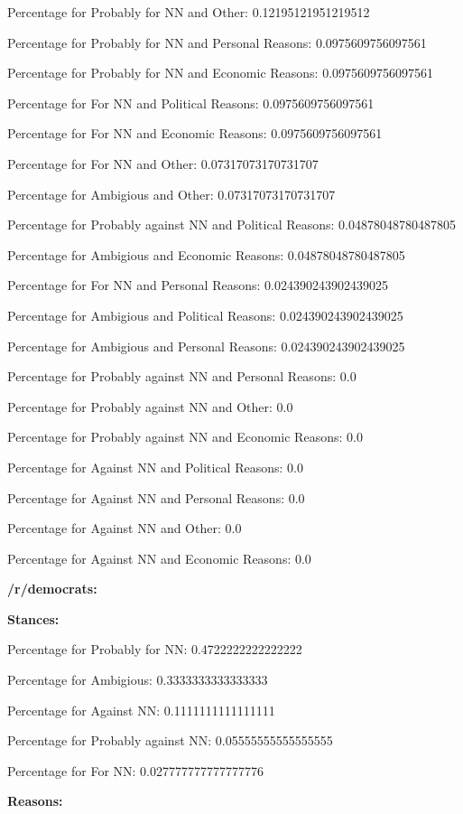 \documentclass[11pt]{article}
\begin{document}
	Percentage for Probably for NN and Other: 0.12195121951219512
	
	Percentage for Probably for NN and Personal Reasons: 0.0975609756097561
	
	Percentage for Probably for NN and Economic Reasons: 0.0975609756097561
	
	Percentage for For NN and Political Reasons: 0.0975609756097561
	
	Percentage for For NN and Economic Reasons: 0.0975609756097561
	
	Percentage for For NN and Other: 0.07317073170731707
	
	Percentage for Ambigious and Other: 0.07317073170731707
	
	Percentage for Probably against NN and Political Reasons: 0.04878048780487805
	
	Percentage for Ambigious and Economic Reasons: 0.04878048780487805
	
	Percentage for For NN and Personal Reasons: 0.024390243902439025
	
	Percentage for Ambigious and Political Reasons: 0.024390243902439025
	
	Percentage for Ambigious and Personal Reasons: 0.024390243902439025
	
	Percentage for Probably against NN and Personal Reasons: 0.0
	
	Percentage for Probably against NN and Other: 0.0
	
	Percentage for Probably against NN and Economic Reasons: 0.0
	
	Percentage for Against NN and Political Reasons: 0.0
	
	Percentage for Against NN and Personal Reasons: 0.0
	
	Percentage for Against NN and Other: 0.0
	
	Percentage for Against NN and Economic Reasons: 0.0
	
	\textbf{/r/democrats:}
	
	\textbf{Stances:}
	
	Percentage for Probably for NN: 0.4722222222222222
	
	Percentage for Ambigious: 0.3333333333333333
	
	Percentage for Against NN: 0.1111111111111111
	
	Percentage for Probably against NN: 0.05555555555555555
	
	Percentage for For NN: 0.027777777777777776
	
	\textbf{Reasons:}
	
\end{document}
